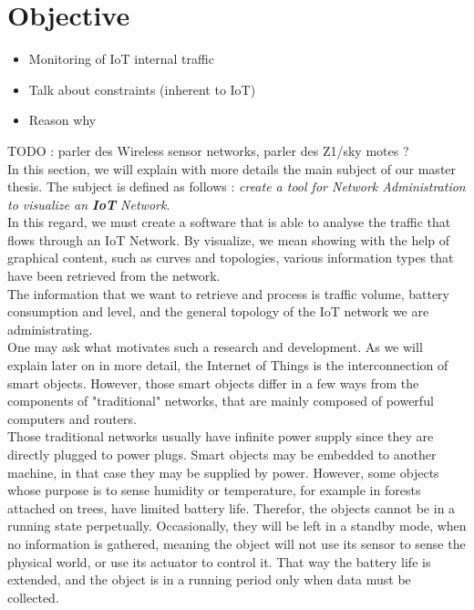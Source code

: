 \chapter{Objective}

\begin{itemize}
	\item Monitoring of IoT internal traffic
	\item Talk about constraints (inherent to IoT)
	\item Reason why
\end{itemize}

TODO : parler des Wireless sensor networks, parler des Z1/sky motes ? \\

In this section, we will explain with more details the main subject of our master thesis. The subject is defined as follows : \textit{create a tool for Network Administration to visualize an \textbf{IoT} Network}.\\

In this regard, we must create a software that is able to analyse the traffic that flows through an IoT Network. By visualize, we mean showing with the help of graphical content, such as curves and topologies, various information types that have been retrieved from the network.\\

The information that we want to retrieve and process is traffic volume, battery consumption and level, and the general topology of the IoT network we are administrating.\\

One may ask what motivates such a research and development. As we will explain later on in more detail, the Internet of Things is the interconnection of smart objects. However, those smart objects differ in a few ways from the components of "traditional" networks, that are mainly composed of powerful computers and routers.\\

Those traditional networks usually have infinite power supply since they are directly plugged to power plugs. Smart objects may be embedded to another machine, in that case they may be supplied by power. However, some objects whose purpose is to sense humidity or temperature, for example in forests attached on trees, have limited battery life. Therefor, the objects cannot be in a running state perpetually. Occasionally, they will be left in a standby mode, when no information is gathered, meaning the object will not use its sensor to sense the physical world, or use its actuator to control it. That way the battery life is extended, and the object is in a running period only when data must be collected. \\

